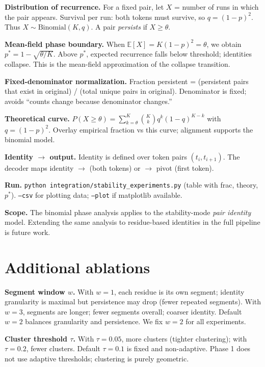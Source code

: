 \textbf{Distribution of recurrence.}
For a fixed pair, let $X$ = number of runs in which the pair appears. Survival per run: both tokens must survive, so $q = (1-p)^2$. Thus $X \sim \text{Binomial}(K, q)$. A pair \emph{persists} if $X \geq \theta$.

\textbf{Mean-field phase boundary.}
When $\mathbb{E}[X] = K(1-p)^2 = \theta$, we obtain $p^* = 1 - \sqrt{\theta/K}$. Above $p^*$, expected recurrence falls below threshold; identities collapse. This is the mean-field approximation of the collapse transition.

\textbf{Fixed-denominator normalization.}
Fraction persistent = (persistent pairs that exist in original) / (total unique pairs in original). Denominator is fixed; avoids ``counts change because denominator changes.''

\textbf{Theoretical curve.}
$P(X \geq \theta) = \sum_{k=\theta}^{K} \binom{K}{k} q^k (1-q)^{K-k}$ with $q = (1-p)^2$. Overlay empirical fraction vs this curve; alignment supports the binomial model.

\textbf{Identity $\rightarrow$ output.}
Identity is defined over token pairs $(t_i, t_{i+1})$. The decoder maps identity $\rightarrow$ (both tokens) or $\rightarrow$ pivot (first token).

\textbf{Run.}
\texttt{python integration/stability\_experiments.py} (table with frac, theory, $p^*$). \texttt{--csv} for plotting data; \texttt{--plot} if matplotlib available.

\textbf{Scope.}
The binomial phase analysis applies to the stability-mode \emph{pair identity} model. Extending the same analysis to residue-based identities in the full pipeline is future work.

\section{Additional ablations}
\label{app:ablations}

\textbf{Segment window $w$.}
With $w=1$, each residue is its own segment; identity granularity is maximal but persistence may drop (fewer repeated segments). With $w=3$, segments are longer; fewer segments overall; coarser identity. Default $w=2$ balances granularity and persistence. We fix $w=2$ for all experiments.

\textbf{Cluster threshold $\tau$.}
With $\tau=0.05$, more clusters (tighter clustering); with $\tau=0.2$, fewer clusters. Default $\tau=0.1$ is fixed and non-adaptive. Phase 1 does not use adaptive thresholds; clustering is purely geometric.

